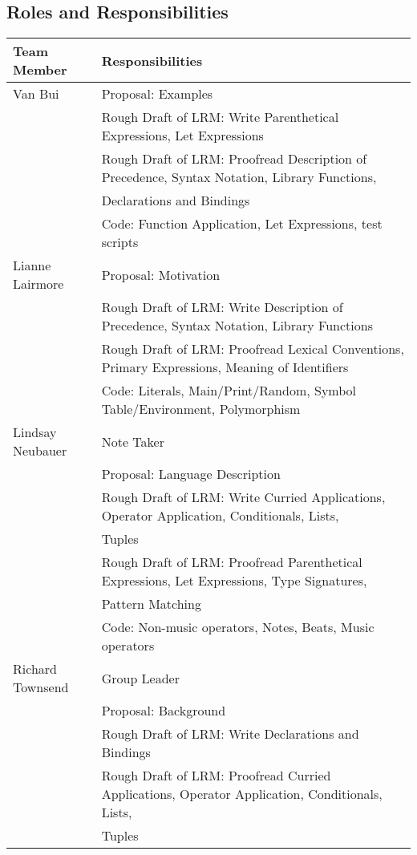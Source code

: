 	\subsection{Roles and Responsibilities}
		\begin{table}[htdp]
		\begin{tabular}{|l|l|}
		\hline
		Team Member & Responsibilities \\ 
		\hline
		Van Bui & Proposal: Examples \\
					& Rough Draft of LRM: Write Parenthetical Expressions, Let Expressions \\
					& Rough Draft of LRM: Proofread  Description of Precedence, Syntax Notation, Library Functions, \\ 
					& Declarations and Bindings \\
					& Code: Function Application, Let Expressions, test scripts  \\
		Lianne Lairmore & Proposal: Motivation \\
									& Rough Draft of LRM: Write Description of Precedence, Syntax Notation, Library Functions \\
									& Rough Draft of LRM: Proofread Lexical Conventions, Primary Expressions, Meaning of Identifiers \\
									& Code: Literals, Main/Print/Random, Symbol Table/Environment, Polymorphism \\
		Lindsay Neubauer & Note Taker \\
										& Proposal: Language Description\\
										& Rough Draft of LRM: Write Curried Applications, Operator Application, Conditionals, Lists, \\
										& Tuples \\
										& Rough Draft of LRM: Proofread Parenthetical Expressions, Let Expressions, Type Signatures, \\ 
										& Pattern Matching \\
										& Code: Non-music operators, Notes, Beats, Music operators \\
		Richard Townsend & Group Leader \\
										& Proposal: Background \\
										& Rough Draft of LRM:  Write Declarations and Bindings \\
										& Rough Draft of LRM: Proofread Curried Applications, Operator Application, Conditionals, Lists, \\
										& Tuples \\

\end{tabular}
\end{table}
